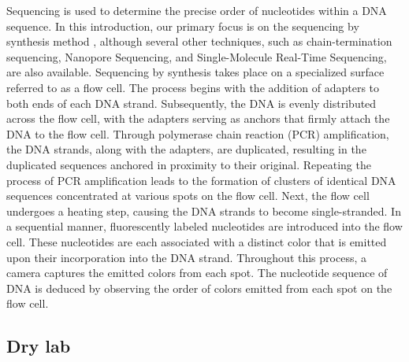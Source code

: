 Sequencing is used to determine the precise order of nucleotides within a DNA sequence. In this introduction, our primary focus is on the sequencing by synthesis method \cite{Canard1994}, although several other techniques, such as chain-termination sequencing\cite{Canard1994}, Nanopore Sequencing\cite{Jain2016}, and Single-Molecule Real-Time Sequencing\cite{Levene2003}, are also available. Sequencing by synthesis takes place on a specialized surface referred to as a flow cell. The process begins with the addition of adapters to both ends of each DNA strand. Subsequently, the DNA is evenly distributed across the flow cell, with the adapters serving as anchors that firmly attach the DNA to the flow cell. Through polymerase chain reaction (PCR) amplification, the DNA strands, along with the adapters, are duplicated, resulting in the duplicated sequences anchored in proximity to their original. Repeating the process of PCR amplification leads to the formation of clusters of identical DNA sequences concentrated at various spots on the flow cell. Next, the flow cell undergoes a heating step, causing the DNA strands to become single-stranded. In a sequential manner, fluorescently labeled nucleotides are introduced into the flow cell. These nucleotides are each associated with a distinct color that is emitted upon their incorporation into the DNA strand. Throughout this process, a camera captures the emitted colors from each spot. The nucleotide sequence of DNA is deduced by observing the order of colors emitted from each spot on the flow cell.

\subsection{Dry lab}

